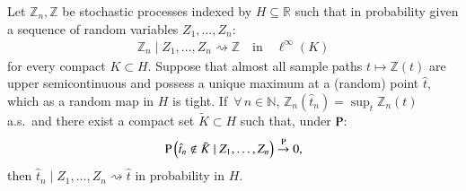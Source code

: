 	\begin{lemma}\label{lemma: cond argmax}
		Let $\mathbb{Z}_n, \mathbb{Z}$ be stochastic processes indexed by $H \subseteq \mathbb{R}$ such that in probability given a sequence of random variables $Z_1,\ldots,Z_n$:
		\begin{align*}
			\mathbb{Z}_n \mid Z_1,\ldots, Z_n \rightsquigarrow \mathbb{Z} \quad \text{in} \quad \ell^{\infty}(K)
		\end{align*}
		for every compact $K \subset H$. Suppose that almost all sample paths $t \mapsto \mathbb{Z}(t)$ are upper semicontinuous and possess a unique maximum at a (random) point $\hat{t}$, which as a random map in $H$ is tight. If $\, \forall \, n \in \mathbb{N}$, $\mathbb{Z}_n (\hat{t}_n) = \sup_t \mathbb{Z}_n (t)$ a.s.\ and there exist a compact set $\tilde{K} \subset H$ such that, under $\mathrm{P}$:
			\begin{align*}
				\mathrm{P} \left( \hat{t}_n \notin \tilde{K} \mid Z_1,\ldots, Z_n  \right) \stackrel{\mathrm{P}}{\rightarrow} 0,
			\end{align*}
		then $\hat{t}_n \mid Z_1,\ldots,Z_n \rightsquigarrow \hat{t}$ in probability in $H$.
	\end{lemma}
